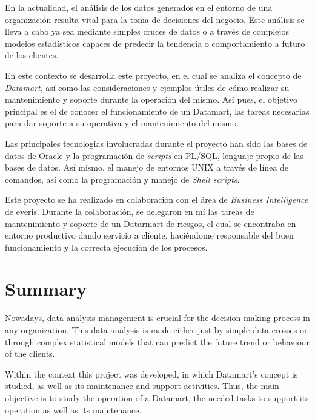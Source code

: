 \documentclass[a4paper, 12pt]{book}
\begin{document}
En la actualidad, el análisis de los datos generados en el entorno de una organización resulta vital para la toma de decisiones del negocio. Este análisis se lleva a cabo ya sea mediante simples cruces de datos o a través de complejos modelos estadísticos capaces de predecir la tendencia o comportamiento a futuro de los clientes.

En este contexto se desarrolla este proyecto, en el cual se analiza el concepto de \textit{Datamart}, así como las consideraciones y ejemplos útiles de cómo realizar su mantenimiento y soporte durante la operación del mismo. Así pues, el objetivo principal es el de conocer el funcionamiento de un Datamart, las tareas necesarias para dar soporte a su operativa y el mantenimiento del mismo.

Las principales tecnologías involucradas durante el proyecto han sido las bases de datos de Oracle y la programación de \textit{scripts} en PL/SQL, lenguaje propio de las bases de datos. Así mismo, el manejo de entornos UNIX a través de línea de comandos, así como la programación y manejo de \textit{Shell scripts}.

Este proyecto se ha realizado en colaboración con el área de \textit{Business Intelligence} de everis. Durante la colaboración, se delegaron en mí las tareas de mantenimiento y soporte de un Datarmart de riesgos, el cual se encontraba en entorno productivo dando servicio a cliente, haciéndome responsable del buen funcionamiento y la correcta ejecución de los procesos.



\chapter*{Summary}

Nowadays, data analysis management is crucial for the decision making process in any organization. This data analysis is made either just by simple data crosses or through complex statistical models that can predict the future trend or behaviour of the clients.

Within the context this project was developed, in which Datamart's concept is studied, as well as its maintenance and support activities. Thus, the main objective is to study the operation of a Datamart, the needed tasks to support its operation as well as its maintenance.
\end{document}
